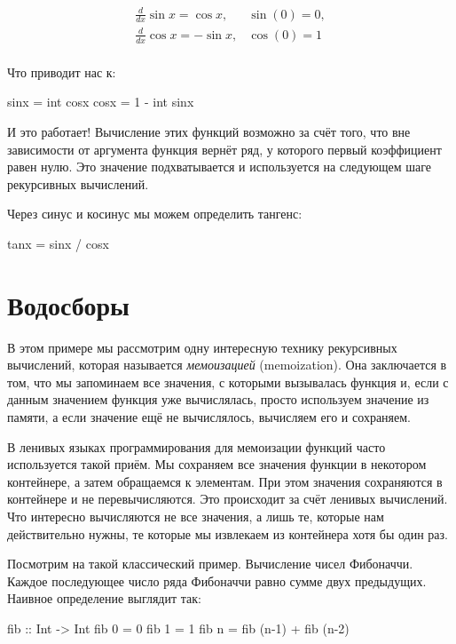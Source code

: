 \[\begin{array}{ll}
\frac{d}{dx} \sin{x} = \cos{x},   & \sin(0) = 0, \\
\frac{d}{dx} \cos{x} = - \sin{x},  & \cos(0) = 1 \\
\end{array}
\]


Что приводит нас к:


\begin{code}
sinx = int cosx
cosx = 1 - int sinx
\end{code}


И это работает! Вычисление этих функций возможно за счёт того,
что вне зависимости от аргумента функция  вернёт
ряд, у которого первый коэффициент равен нулю. Это значение 
подхватывается и используется на следующем шаге рекурсивных 
вычислений.

Через синус и косинус мы можем определить тангенс:

\begin{code}
tanx = sinx / cosx
\end{code}

\section{Водосборы}

В этом примере мы рассмотрим одну интересную технику
рекурсивных вычислений, которая называется 
\emph{мемоизацией} (memoization). Она заключается
в том, что мы запоминаем все значения, с которыми вызывалась
функция и, если с данным значением функция уже вычислялась, 
просто используем значение из памяти, а если значение 
ещё не вычислялось, вычисляем его и сохраняем. 

В ленивых языках программирования для мемоизации 
функций часто используется такой приём. Мы сохраняем
все значения функции в некотором контейнере, а затем
обращаемся к элементам. При этом значения
сохраняются в контейнере и не перевычисляются. Это
происходит за счёт ленивых вычислений. Что интересно
вычисляются не все значения, а лишь те, которые нам 
действительно нужны, те которые мы извлекаем из 
контейнера хотя бы один раз. 

Посмотрим на такой классический пример. 
Вычисление чисел Фибоначчи. Каждое последующее
число ряда Фибоначчи равно сумме двух предыдущих.
Наивное определение выглядит так:

\begin{code}
fib :: Int -> Int
fib 0 = 0
fib 1 = 1
fib n = fib (n-1) + fib (n-2)
\end{code}

